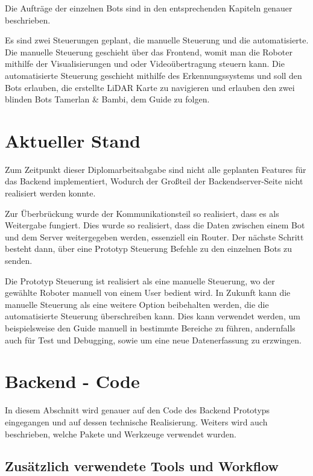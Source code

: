 Die Aufträge der einzelnen Bots 
sind in den entsprechenden Kapiteln genauer beschrieben.

Es sind zwei Steuerungen geplant, 
die manuelle Steuerung und die automatisierte.
% 
Die manuelle Steuerung geschieht über das Frontend, 
womit man die Roboter mithilfe der Visualisierungen 
und oder Videoübertragung steuern kann.
% 
Die automatisierte Steuerung geschieht mithilfe des Erkennungssystems 
und soll den Bots erlauben, die erstellte LiDAR Karte zu navigieren 
und erlauben den zwei blinden Bots Tamerlan \& Bambi, dem Guide zu folgen.

\section{Aktueller Stand}
\label{subsec:backend_aktueller_stand}
Zum Zeitpunkt dieser Diplomarbeitsabgabe 
sind nicht alle geplanten Features für das Backend implementiert,
Wodurch der Großteil der Backendserver-Seite nicht realisiert werden konnte.

Zur Überbrückung wurde der Kommunikationsteil so realisiert, 
dass es als Weitergabe fungiert.
Dies wurde so realisiert, dass die Daten 
zwischen einem Bot und dem Server weitergegeben werden, essenziell ein Router. 
Der nächste Schritt besteht dann, über eine Prototyp Steuerung 
Befehle zu den einzelnen Bots zu senden.

Die Prototyp Steuerung ist realisiert als eine manuelle Steuerung, 
wo der gewählte Roboter manuell von einem User bedient wird.
In Zukunft kann die manuelle Steuerung als eine weitere Option beibehalten werden, 
die die automatisierte Steuerung überschreiben kann. 
Dies kann verwendet werden, 
um beispielsweise den Guide manuell in bestimmte Bereiche zu führen,
andernfalls auch für Test und Debugging, 
sowie um eine neue Datenerfassung zu erzwingen.

\section{Backend - Code}
In diesem Abschnitt wird genauer auf den Code des Backend Prototyps eingegangen 
und auf dessen technische Realisierung. 
Weiters wird auch beschrieben, welche Pakete und Werkzeuge verwendet wurden. 

\subsection{Zusätzlich verwendete Tools und Workflow}
